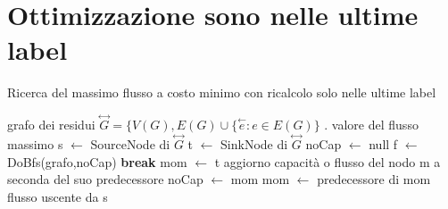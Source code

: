 \documentclass{article}
\begin{document}
\section{Ottimizzazione sono nelle ultime label}
\begin{algorithm}
\caption{Ricerca del massimo flusso a costo minimo con ricalcolo solo nelle ultime label}
\begin{algorithmic}
\REQUIRE grafo dei residui $\overset{\leftrightarrow}{G} = \{V(G),E(G) \cup \{ \overset{\leftarrow}{e} : e \in E(G) \}$ .
\ENSURE valore del flusso massimo
\STATE s $\leftarrow$ SourceNode di $\overset{\leftrightarrow}{G}$
\STATE t $\leftarrow$ SinkNode di $\overset{\leftrightarrow}{G}$
\STATE noCap $\leftarrow$ null
\LOOP
\STATE f $\leftarrow$ DoBfs(grafo,noCap)
\STATE \textbf{break}
\ENDIF
\STATE mom $\leftarrow$ t
\STATE aggiorno capacità o flusso del nodo m a seconda del suo predecessore
\STATE noCap $\leftarrow$ mom
\ENDIF
\STATE mom $\leftarrow$ predecessore di mom
\ENDWHILE
\ENDLOOP
\RETURN flusso uscente da s
\end{algorithmic}
\end{algorithm}
\end{document}
